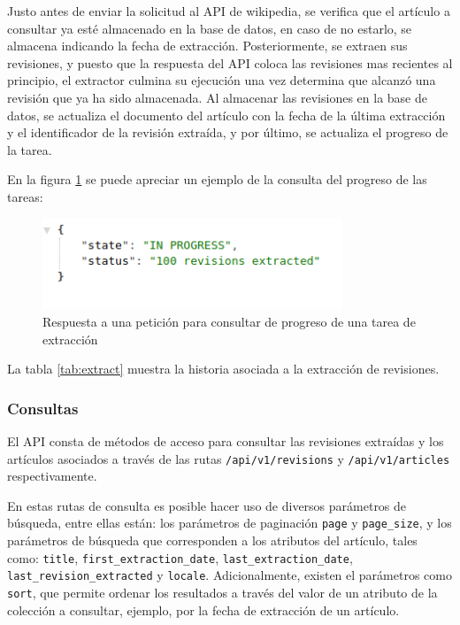 Justo antes de enviar la solicitud al API de wikipedia, se verifica que el artículo a consultar ya esté almacenado en la base de datos, en caso de no estarlo, se almacena indicando la fecha de extracción.
Posteriormente, se extraen sus revisiones, y puesto que la respuesta del API coloca las revisiones mas recientes al principio, el extractor culmina su ejecución una vez determina que alcanzó una revisión que ya ha sido almacenada.
Al almacenar las revisiones en la base de datos, se actualiza el documento del artículo con la fecha de la última extracción y el identificador de la revisión extraída, y por último, se actualiza el progreso de la tarea.

En la figura \ref{fig:response_status} se puede apreciar un ejemplo de la consulta del progreso de las tareas:

\begin{figure}[H]
	\centering
		\includegraphics[width=0.8\textwidth]{figures/response_status}
	\caption{Respuesta a una petición para consultar de progreso de una tarea de extracción}
	\label{fig:response_status}
\end{figure}

La tabla \ref{tab:extract} muestra la historia asociada a la extracción de revisiones.



\subsubsection{Consultas}

El API consta de métodos de acceso para consultar las revisiones extraídas y
los artículos asociados a través de las rutas \texttt{/api/v1/revisions} y \texttt{/api/v1/articles} respectivamente.

En estas rutas de consulta es posible hacer uso de diversos parámetros de búsqueda,
entre ellas están: los parámetros de paginación \texttt{page} y \texttt{page\_size},
y los parámetros de búsqueda que corresponden a los atributos del artículo,
tales como: \texttt{title}, \texttt{first\_extraction\_date}, \texttt{last\_extraction\_date}, \texttt{last\_revision\_extracted} y \texttt{locale}.
Adicionalmente, existen el parámetros como \texttt{sort}, que permite ordenar los resultados a través del valor de un atributo de la colección a consultar, ejemplo, por la fecha de extracción de un artículo.

